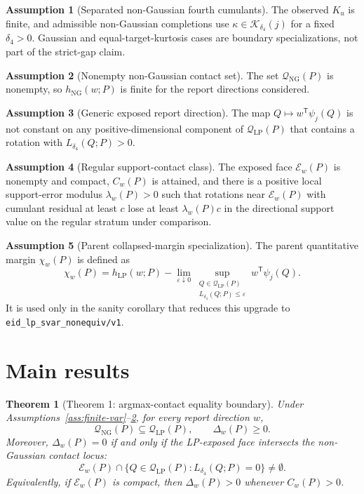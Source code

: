 \documentclass[11pt]{article}
\newcommand{\transpose}{\mathsf{T}}
\theoremstyle{definition}
\newtheorem{assumption}{Assumption}
\theoremstyle{plain}
\newtheorem{theorem}{Theorem}
\theoremstyle{remark}
\begin{document}
\begin{assumption}[Separated non-Gaussian fourth cumulants]\label{ass:cumulants}
The observed \(K_u\) is finite, and admissible non-Gaussian completions use \(\kappa\in\mathcal K_{\delta_4}(j)\) for a fixed \(\delta_4>0\).  Gaussian and equal-target-kurtosis cases are boundary specializations, not part of the strict-gap claim.
\end{assumption}

\begin{assumption}[Nonempty non-Gaussian contact set]\label{ass:nonempty-ng}
The set \(\mathcal Q_{\mathrm{NG}}(P)\) is nonempty, so \(h_{\mathrm{NG}}(w;P)\) is finite for the report directions considered.
\end{assumption}

\begin{assumption}[Generic exposed report direction]\label{ass:generic-w}
The map \(Q\mapsto w^\transpose\psi_j(Q)\) is not constant on any positive-dimensional component of \(\mathcal Q_{\mathrm{LP}}(P)\) that contains a rotation with \(L_{\delta_4}(Q;P)>0\).
\end{assumption}

\begin{assumption}[Regular support-contact class]\label{ass:regular-contact}
The exposed face \(\mathcal E_w(P)\) is nonempty and compact, \(C_w(P)\) is attained, and there is a positive local support-error modulus \(\lambda_w(P)>0\) such that rotations near \(\mathcal E_w(P)\) with cumulant residual at least \(c\) lose at least \(\lambda_w(P)c\) in the directional support value on the regular stratum under comparison.
\end{assumption}

\begin{assumption}[Parent collapsed-margin specialization]\label{ass:parent-margin}
The parent quantitative margin \(\chi_w(P)\) is defined as
\[
\chi_w(P)=h_{\mathrm{LP}}(w;P)-
\lim_{\varepsilon\downarrow0}
\sup_{\substack{Q\in\mathcal Q_{\mathrm{LP}}(P)\\L_{\delta_4}(Q;P)\le\varepsilon}}
w^\transpose\psi_j(Q).
\]
It is used only in the sanity corollary that reduces this upgrade to \texttt{eid\_lp\_svar\_nonequiv/v1}.
\end{assumption}

\section{Main results}
\begin{theorem}[Theorem 1: argmax-contact equality boundary]\label{thm:argmax-boundary}
Under Assumptions~\ref{ass:finite-var}--\ref{ass:nonempty-ng}, for every report direction \(w\),
\[
\mathcal Q_{\mathrm{NG}}(P)\subseteq\mathcal Q_{\mathrm{LP}}(P),\qquad \Delta_w(P)\ge0.
\]
Moreover, \(\Delta_w(P)=0\) if and only if the LP-exposed face intersects the non-Gaussian contact locus:
\[
\mathcal E_w(P)\cap\{Q\in\mathcal Q_{\mathrm{LP}}(P):L_{\delta_4}(Q;P)=0\}\ne\emptyset.
\]
Equivalently, if \(\mathcal E_w(P)\) is compact, then \(\Delta_w(P)>0\) whenever \(C_w(P)>0\).
\end{theorem}
\end{document}
